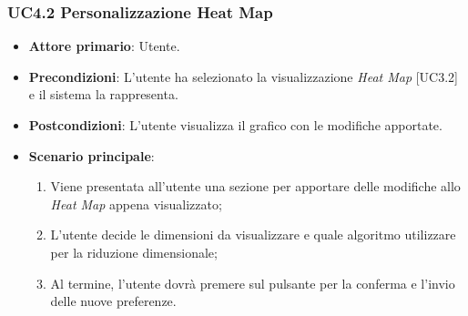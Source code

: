 \subsubsection{UC4.2 Personalizzazione Heat Map}
\begin{itemize}
	\item \textbf{Attore primario}: Utente.
	\item \textbf{Precondizioni}: L'utente ha selezionato la visualizzazione \textit{Heat Map} [UC3.2] e il sistema la rappresenta.
	\item \textbf{Postcondizioni}: L'utente visualizza il grafico con le modifiche apportate.
	\item \textbf{Scenario principale}:
	\begin{enumerate}
			\item Viene presentata all'utente una sezione per apportare delle modifiche allo \textit{Heat Map} appena visualizzato;
			\item L'utente decide le dimensioni da visualizzare e quale algoritmo utilizzare per la riduzione dimensionale;
			\item Al termine, l'utente dovrà premere sul pulsante per la conferma e l'invio delle nuove preferenze.
		\end{enumerate}
\end{itemize}